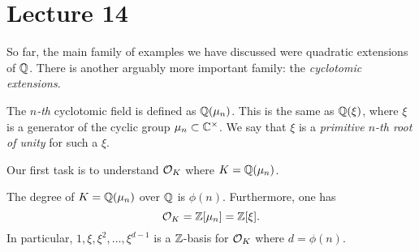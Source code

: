 \section{Lecture 14}

So far, the main family of examples we have discussed were quadratic extensions of $\mathbb{Q}$.
There is another arguably more important family: the \emph{cyclotomic extensions}.

The \emph{$n$-th} cyclotomic field is defined as $\mathbb{Q}(\mu_{n})$.
This is the same as $\mathbb{Q}(\xi)$, where $\xi$ is a generator of the cyclic group $\mu_{n} \subset \mathbb{C}^{\times}$.
We say that $\xi$ is a \emph{primitive $n$-th root of unity} for such a $\xi$.

Our first task is to understand $\mathcal{O}_{K}$ where $K = \mathbb{Q}(\mu_{n})$.
\begin{theorem}
  The degree of $K = \mathbb{Q}(\mu_{n})$ over $\mathbb{Q}$ is $\phi(n)$.
  Furthermore, one has
  \[ \mathcal{O}_{K} = \mathbb{Z}[\mu_{n}] = \mathbb{Z}[\xi]. \]
  In particular, $1,\xi,\xi^{2},\ldots,\xi^{d-1}$ is a $\mathbb{Z}$-basis for $\mathcal{O}_{K}$ where $d = \phi(n)$.
\end{theorem}
